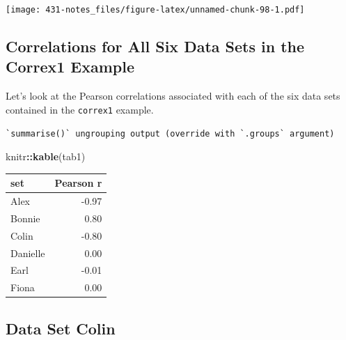 \documentclass[
]{book}
\newenvironment{Shaded}{\begin{snugshade}}{\end{snugshade}}
\newcommand{\DataTypeTok}[1]{\textcolor[rgb]{0.13,0.29,0.53}{#1}}
\newcommand{\DecValTok}[1]{\textcolor[rgb]{0.00,0.00,0.81}{#1}}
\newcommand{\KeywordTok}[1]{\textcolor[rgb]{0.13,0.29,0.53}{\textbf{#1}}}
\newcommand{\NormalTok}[1]{#1}
\newcommand{\OperatorTok}[1]{\textcolor[rgb]{0.81,0.36,0.00}{\textbf{#1}}}
\newcommand{\StringTok}[1]{\textcolor[rgb]{0.31,0.60,0.02}{#1}}
\begin{document}
\texttt{[image: 431-notes\_files/figure-latex/unnamed-chunk-98-1.pdf]}

\hypertarget{correlations-for-all-six-data-sets-in-the-correx1-example}{%
\subsection{Correlations for All Six Data Sets in the Correx1 Example}\label{correlations-for-all-six-data-sets-in-the-correx1-example}}

Let's look at the Pearson correlations associated with each of the six data sets contained in the \texttt{correx1} example.

\begin{Shaded}
\end{Shaded}

\begin{verbatim}
`summarise()` ungrouping output (override with `.groups` argument)
\end{verbatim}

\begin{Shaded}
\begin{Highlighting}[]
\NormalTok{knitr}\OperatorTok{::}\KeywordTok{kable}\NormalTok{(tab1)}
\end{Highlighting}
\end{Shaded}

\begin{tabular}{l|r}
\hline
set & Pearson r\\
\hline
Alex & -0.97\\
\hline
Bonnie & 0.80\\
\hline
Colin & -0.80\\
\hline
Danielle & 0.00\\
\hline
Earl & -0.01\\
\hline
Fiona & 0.00\\
\hline
\end{tabular}

\hypertarget{data-set-colin}{%
\subsection{Data Set Colin}\label{data-set-colin}}
\end{document}
